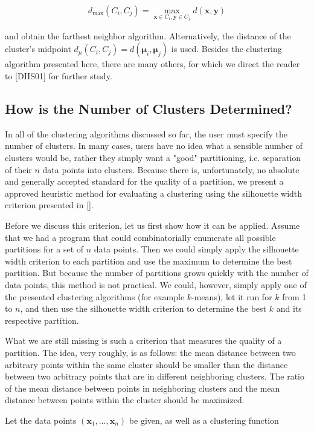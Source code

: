 \documentclass[10pt]{book}
\begin{document}
$$
d_{\max }\left(C_{i}, C_{j}\right)=\max _{\boldsymbol{x} \in C_{i}, \boldsymbol{y} \in C_{j}} d(\boldsymbol{x}, \boldsymbol{y})
$$

and obtain the farthest neighbor algorithm. Alternatively, the distance of the cluster's midpoint $d_{\mu}\left(C_{i}, C_{j}\right)=d\left(\boldsymbol{\mu}_{i}, \boldsymbol{\mu}_{j}\right)$ is used. Besides the clustering algorithm presented here, there are many others, for which we direct the reader to [DHS01] for further study.

\subsection{How is the Number of Clusters Determined?}
In all of the clustering algorithms discussed so far, the user must specify the number of clusters. In many cases, users have no idea what a sensible number of clusters would be, rather they simply want a "good" partitioning, i.e. separation of their $n$ data points into clusters. Because there is, unfortunately, no absolute and generally accepted standard for the quality of a partition, we present a approved heuristic method for evaluating a clustering using the silhouette width criterion presented in [\cite{rousseeuw1987silhouettes}].

Before we discuss this criterion, let us first show how it can be applied. Assume that we had a program that could combinatorially enumerate all possible partitions for a set of $n$ data points. Then we could simply apply the silhouette width criterion to each partition and use the maximum to determine the best partition. But because the number of partitions grows quickly with the number of data points, this method is not practical. We could, however, simply apply one of the presented clustering algorithms (for example $k$-means), let it run for $k$ from 1 to $n$, and then use the silhouette width criterion to determine the best $k$ and its respective partition.

What we are still missing is such a criterion that measures the quality of a partition. The idea, very roughly, is as follows: the mean distance between two arbitrary points within the same cluster should be smaller than the distance between two arbitrary points that are in different neighboring clusters. The ratio of the mean distance between points in neighboring clusters and the mean distance between points within the cluster should be maximized.

Let the data points $\left(\boldsymbol{x}_{1}, \ldots, \boldsymbol{x}_{n}\right)$ be given, as well as a clustering function
\end{document}

